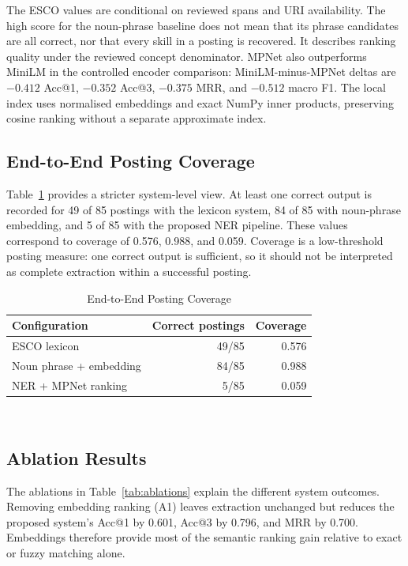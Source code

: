 \documentclass[conference]{IEEEtran}
\begin{document}
The ESCO values are conditional on reviewed spans and URI availability. The high score for the noun-phrase baseline does not mean that its phrase candidates are all correct, nor that every skill in a posting is recovered. It describes ranking quality under the reviewed concept denominator. MPNet also outperforms MiniLM in the controlled encoder comparison: MiniLM-minus-MPNet deltas are $-0.412$ Acc@1, $-0.352$ Acc@3, $-0.375$ MRR, and $-0.512$ macro F1. The local index uses normalised embeddings and exact NumPy inner products, preserving cosine ranking without a separate approximate index.

\subsection{End-to-End Posting Coverage}
Table~\ref{tab:coverage} provides a stricter system-level view. At least one correct output is recorded for 49 of 85 postings with the lexicon system, 84 of 85 with noun-phrase embedding, and 5 of 85 with the proposed NER pipeline. These values correspond to coverage of 0.576, 0.988, and 0.059. Coverage is a low-threshold posting measure: one correct output is sufficient, so it should not be interpreted as complete extraction within a successful posting.

\begin{table}[!t]
\caption{End-to-End Posting Coverage}
\label{tab:coverage}
\centering
\small
\begin{tabular}{lrr}
\toprule
Configuration & Correct postings & Coverage \\
\midrule
ESCO lexicon & 49/85 & 0.576 \\
Noun phrase + embedding & 84/85 & 0.988 \\
NER + MPNet ranking & 5/85 & 0.059 \\
\bottomrule
\end{tabular}
\\[1mm]
\par\vspace{1mm}{\footnotesize Source: corrected end-to-end fields in the Irish results table.}
\end{table}

\subsection{Ablation Results}
The ablations in Table~\ref{tab:ablations} explain the different system outcomes. Removing embedding ranking (A1) leaves extraction unchanged but reduces the proposed system's Acc@1 by 0.601, Acc@3 by 0.796, and MRR by 0.700. Embeddings therefore provide most of the semantic ranking gain relative to exact or fuzzy matching alone.
\end{document}
